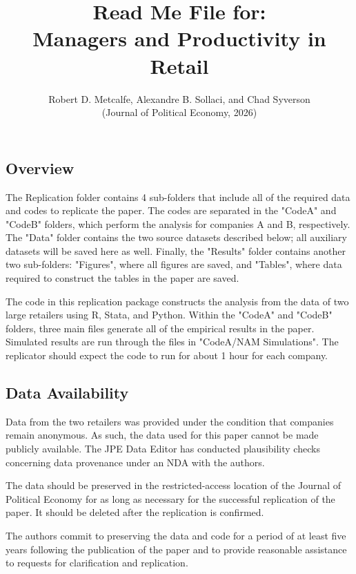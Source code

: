 \documentclass[
]{article}
\begin{document}
\title{\textbf{Read Me File for: \\
Managers and Productivity in Retail}}
\author{Robert D. Metcalfe, Alexandre B. Sollaci, and Chad Syverson \\
(Journal of Political Economy, 2026)}	
\date{}
\maketitle 
\thispagestyle{empty}


\subsection{Overview}

The Replication folder contains 4 sub-folders that include all of the required data and codes to replicate the paper. The codes are separated in the "CodeA" and "CodeB" folders, which perform the analysis for companies A and B, respectively. The "Data" folder contains the two source datasets described below; all auxiliary datasets will be saved here as well. Finally, the "Results" folder contains another two sub-folders: "Figures", where all figures are saved, and "Tables", where data required to construct the tables in the paper are saved.

The code in this replication package constructs the analysis from the data of two large retailers using R, Stata, and Python. Within the "CodeA" and "CodeB" folders, three main files generate all of the empirical results in the paper. Simulated results are run through the files in "CodeA/NAM Simulations". The replicator should expect the code to run for about 1 hour for each company.

\subsection{Data Availability}

Data from the two retailers was provided under the condition that companies remain anonymous. As such, the data used for this paper cannot be made publicly available. The JPE Data Editor has conducted plausibility checks concerning data provenance under an NDA with the authors.

The data should be preserved in the restricted-access location of the Journal of Political Economy for as long as necessary for the successful replication of the paper. It should be deleted after the replication is confirmed.

The authors commit to preserving the data and code for a period of at least five years following the publication of the paper and to provide reasonable assistance to requests
for clarification and replication.
\end{document}

